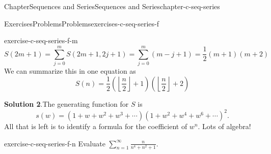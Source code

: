 \documentclass[oneside,10pt,]{book}
\newcommand{\blocktitlefont}{\relax}
\numberwithin{equation}{section}
\begin{document}
\begin{chapterptx}{Chapter}{Sequences and Series}{}{Sequences and Series}{}{}{chapter-c-seq-series}
\begin{exercises-section}{Exercises}{Problems}{}{Problems}{}{}{exercises-c-seq-series-f}
\begin{divisionexercise}{12}{}{}{exercise-c-seq-series-f-m}
\begin{equation*}
\end{equation*}
%
\begin{equation*}
S(2m+1) =\sum _{j=0}^m S(2 m+1,2 j+1)=\sum _{j=0}^m (m-j+1)=\frac{1}{2} (m+1) (m+2)
\end{equation*}
We can summarize this in one equation as%
\begin{equation*}
S(n) =\frac{1}{2} \left(\left\lfloor \frac{n}{2}\right\rfloor +1\right) \left(\left\lfloor \frac{n}{2}\right\rfloor +2\right)
\end{equation*}
%
\par\smallskip%
\noindent\textbf{\blocktitlefont Solution 2}.\hypertarget{solution-c-seq-series-f-m-c}{}\quad{}The generating function for \(S\) is%
\begin{equation*}
s(w)= (1+w+w^2+w^3+\cdots)(1+w^2+w^4+w^6+\cdots)^2.
\end{equation*}
All that is left is to identify a formula for the coefficient of \(w^n\).  Lots of algebra!%
\end{divisionexercise}%
\begin{divisionexercise}{13}{}{}{exercise-c-seq-series-f-n}%
Evaluate \(\sum_{n=1}^{\infty} \frac{n}{n^4+n^2+1}\).%
\end{divisionexercise}%
\end{exercises-section}
\end{chapterptx}
%
%
\typeout{************************************************}
\typeout{************************************************}
%
\end{document}
